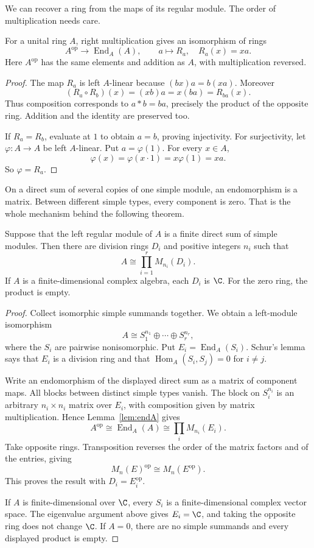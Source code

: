 We can recover a ring from the maps of its regular module. The order of multiplication needs care.

\begin{lemma}\label{lem:endA}
For a unital ring $A$, right multiplication gives an isomorphism of rings
\[
A^{\mathrm{op}}\longrightarrow\operatorname{End}_A(A),\qquad
 a\longmapsto R_a,\quad R_a(x)=xa.
\]
Here $A^{\mathrm{op}}$ has the same elements and addition as $A$, with multiplication reversed.
\end{lemma}

\begin{proof}
The map $R_a$ is left $A$-linear because $(bx)a=b(xa)$. Moreover
\[
(R_a\circ R_b)(x)=(xb)a=x(ba)=R_{ba}(x).
\]
Thus composition corresponds to $a*b=ba$, precisely the product of the opposite ring. Addition and the identity are preserved too.

If $R_a=R_b$, evaluate at $1$ to obtain $a=b$, proving injectivity. For surjectivity, let $\varphi:A\to A$ be left $A$-linear. Put $a=\varphi(1)$. For every $x\in A$,
\[
\varphi(x)=\varphi(x\cdot1)=x\varphi(1)=xa.
\]
So $\varphi=R_a$.
\end{proof}

On a direct sum of several copies of one simple module, an endomorphism is a matrix. Between different simple types, every component is zero. That is the whole mechanism behind the following theorem.

\begin{theorem}[Wedderburn, 1908]\label{thm:wedderburn}
Suppose that the left regular module of $A$ is a finite direct sum of simple modules. Then there are division rings $D_i$ and positive integers $n_i$ such that
\[
A\cong\prod_{i=1}^rM_{n_i}(D_i).
\]
If $A$ is a finite-dimensional complex algebra, each $D_i$ is $\C$. For the zero ring, the product is empty.
\end{theorem}

\begin{proof}
Collect isomorphic simple summands together. We obtain a left-module isomorphism
\[
A\cong S_1^{n_1}\oplus\cdots\oplus S_r^{n_r},
\]
where the $S_i$ are pairwise nonisomorphic. Put $E_i=\operatorname{End}_A(S_i)$. Schur's lemma says that $E_i$ is a division ring and that $\operatorname{Hom}_A(S_i,S_j)=0$ for $i\ne j$.

Write an endomorphism of the displayed direct sum as a matrix of component maps. All blocks between distinct simple types vanish. The block on $S_i^{n_i}$ is an arbitrary $n_i\times n_i$ matrix over $E_i$, with composition given by matrix multiplication. Hence Lemma~\ref{lem:endA} gives
\[
A^{\mathrm{op}}\cong\operatorname{End}_A(A)
\cong\prod_iM_{n_i}(E_i).
\]
Take opposite rings. Transposition reverses the order of the matrix factors and of the entries, giving
\[
M_n(E)^{\mathrm{op}}\cong M_n(E^{\mathrm{op}}).
\]
This proves the result with $D_i=E_i^{\mathrm{op}}$.

If $A$ is finite-dimensional over $\C$, every $S_i$ is a finite-dimensional complex vector space. The eigenvalue argument above gives $E_i=\C$, and taking the opposite ring does not change $\C$. If $A=0$, there are no simple summands and every displayed product is empty.
\end{proof}

